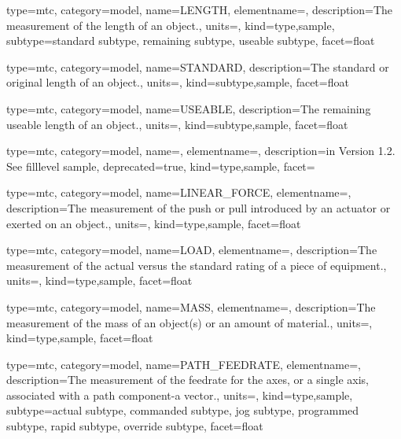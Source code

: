 {
  type=mtc,
  category=model,
  name={LENGTH},
  elementname=,
  description={The measurement of the length of an object.},
  units=,
  kind={type,sample},
  subtype={\gls{standard subtype}, \gls{remaining subtype}, \gls{useable subtype}},
  facet={\gls{float}}
}


{
  type=mtc,
  category=model,
  name={STANDARD},
  description={The standard or original length of an object.},
  units=,
  kind={subtype,sample},
  facet={\gls{float}}
}


{
  type=mtc,
  category=model,
  name={USEABLE},
  description={The remaining useable length of an object.},
  units=,
  kind={subtype,sample},
  facet={\gls{float}}
}


{
  type=mtc,
  category=model,
  name=,
  elementname=,
  description={\DEPRECATED in Version 1.2.  See \gls{filllevel sample}},
  deprecated={true},
  kind={type,sample},
  facet={}
}


{
  type=mtc,
  category=model,
  name={LINEAR\_FORCE},
  elementname=,
  description={The measurement of the push or pull introduced by an actuator or exerted on an object.},
  units=,
  kind={type,sample},
  facet={\gls{float}}
}


{
  type=mtc,
  category=model,
  name={LOAD},
  elementname=,
  description={The measurement of the actual versus the standard rating of a piece of equipment.},
  units=,
  kind={type,sample},
  facet={\gls{float}}
}


{
  type=mtc,
  category=model,
  name={MASS},
  elementname=,
  description={The measurement of the mass of an object(s) or an amount of material.},
  units=,
  kind={type,sample},
  facet={\gls{float}}
}


{
  type=mtc,
  category=model,
  name={PATH\_FEEDRATE},
  elementname=,
  description={The measurement of the feedrate for the axes, or a single axis, associated with a \gls{path} component-a vector.},
  units=,
  kind={type,sample},
  subtype={\gls{actual subtype}, \gls{commanded subtype}, \gls{jog subtype}, \gls{programmed subtype}, \gls{rapid subtype}, \gls{override subtype}},
  facet={\gls{float}}
}






